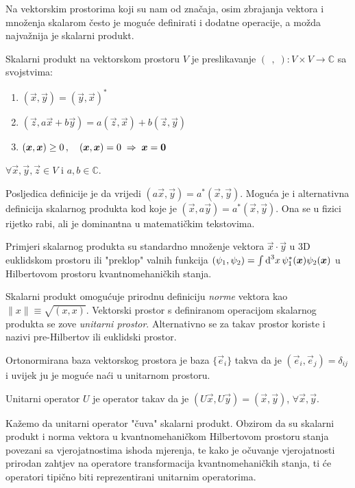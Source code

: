 Na vektorskim prostorima koji su nam od značaja, osim zbrajanja vektora i
množenja skalarom često je moguće definirati i dodatne operacije, a
možda najvažnija je skalarni produkt.

\begin{definicija}
Skalarni produkt na vektorskom prostoru $V$ je preslikavanje
$(\,\;,\;):V\times V \to \mathbb{C}$ sa svojstvima:
\begin{enumerate}
\item $(\vec{x}, \vec{y}) = (\vec{y}, \vec{x})^*$
\item $(\vec{z}, a \vec{x} +b \vec{y})= a(\vec{z},\vec{x})+b(\vec{z},\vec{y})$
\item $(\vec{x}, \vec{x})\ge 0\,, \quad (\vec{x}, \vec{x})=0 \imp \vec{x}=\vec{0}$
\end{enumerate}
$\forall \vec{x}, \vec{y}, \vec{z} \in V$ i $a,b \in\mathbb{C}$.
\label{def:skalarniprodukt}
\end{definicija}

Posljedica definicije je da vrijedi $(a \vec{x}, \vec{y})= a^* (\vec{x}, \vec{y})$.
Moguća je i alternativna definicija skalarnog produkta kod koje je
$(\vec{x}, a \vec{y}) = a^* (\vec{x}, \vec{y})$. Ona se u fizici
rijetko rabi, ali je dominantna u matematičkim tekstovima.

Primjeri skalarnog produkta su standardno množenje
vektora $\vec{x}\cdot \vec{y}$ u 3D euklidskom prostoru ili "preklop"
valnih funkcija
$(\psi_1, \psi_2) = \int \rmd^3 x\, \psi_{1}^{*}(\vec{x}) \psi_{2}(\vec{x})$
u Hilbertovom prostoru kvantnomehaničkih stanja.

Skalarni produkt omogućuje prirodnu definiciju \emph{norme} vektora
  kao $\lVert x\rVert \equiv \sqrt{(x, x)}$.
Vektorski prostor s definiranom operacijom skalarnog produkta se
 zove \emph{unitarni prostor}. Alternativno se za takav prostor
 koriste i nazivi pre-Hilbertov ili  euklidski prostor.

Ortonormirana baza vektorskog prostora je baza $\{\vec{e}_i\}$
takva da je $(\vec{e}_i, \vec{e}_j)=\delta_{ij}$ i uvijek ju je moguće
naći u unitarnom prostoru. 

\begin{definicija}
Unitarni operator $U$ je operator takav da je $(U\vec{x}, U\vec{y})
=(\vec{x}, \vec{y})$, $\forall \vec{x}, \vec{y}$. 
\end{definicija}

Kažemo da
unitarni operator "čuva" skalarni produkt. Obzirom da su skalarni
produkt i norma vektora u kvantnomehaničkom Hilbertovom prostoru
stanja povezani sa vjerojatnostima ishoda mjerenja, te kako je očuvanje vjerojatnosti
prirodan zahtjev na operatore transformacija kvantnomehaničkih
stanja, ti će operatori tipično biti reprezentirani unitarnim
operatorima.

